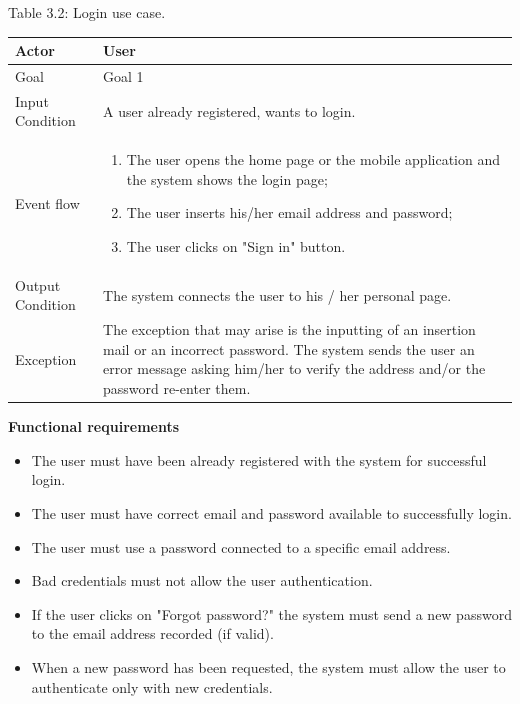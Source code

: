 \documentclass{article}
\begin{document}
	\begin{center}
		Table 3.2: Login use case.
		
		\bigskip
    		\begin{tabular}{p{}|p{}}
   			\hline
    			Actor & User \\ \hline
    			Goal & Goal 1 \\ \hline
    			Input Condition & A user already registered, wants to login. \\ \hline
    			Event flow & 
			\begin{enumerate}
  				\item The user opens the home page or the mobile application and the system shows the login page;
  				\item The user inserts his/her email address and password;
  				\item The user clicks on "Sign in" button.
 			\end{enumerate} \\ \hline
    			Output Condition & The system connects the user to his / her personal page. \\ \hline
    			Exception & The exception that may arise is the inputting of an insertion mail or an incorrect password. The system sends the user an error message asking him/her to verify the address and/or the password re-enter them. \\ \hline
    		\end{tabular}
	\end{center}
	
	\bigskip
	\noindent
	\textbf{Functional requirements} \\
	\begin{itemize}
		\item The user must have been already registered with the system for successful login.
		\item The user must have correct email and password available to successfully login.
		\item The user must use a password connected to a specific email address.
		\item Bad credentials must not allow the user authentication.
		\item If the user clicks on "Forgot password?" the system must send a new password to the email address recorded (if valid).
		\item When a new password has been requested, the system must allow the user to authenticate only with new credentials.
	\end{itemize}
	
\end{document}
